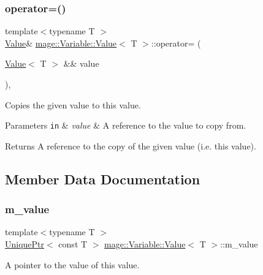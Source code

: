 \subsubsection{\texorpdfstring{operator=()}{operator=()}\hspace{0.1cm}{\footnotesize\ttfamily [2/2]}}
{\footnotesize\ttfamily template$<$typename T $>$ \\
\hyperlink{structmage_1_1_variable_1_1_value}{Value}\& \hyperlink{structmage_1_1_variable_1_1_value}{mage\+::\+Variable\+::\+Value}$<$ T $>$\+::operator= (\begin{DoxyParamCaption}\item[{\hyperlink{structmage_1_1_variable_1_1_value}{Value}$<$ T $>$ \&\&}]{value }\end{DoxyParamCaption})\hspace{0.3cm}{\ttfamily [private]}, {\ttfamily [delete]}}

Copies the given value to this value.


\begin{DoxyParams}[1]{Parameters}
\mbox{\tt in}  & {\em value} & A reference to the value to copy from. \\
\hline
\end{DoxyParams}
\begin{DoxyReturn}{Returns}
A reference to the copy of the given value (i.\+e. this value). 
\end{DoxyReturn}


\subsection{Member Data Documentation}
\hypertarget{structmage_1_1_variable_1_1_value_ae034b2263375fdcfdba4f0cfdb3cd014}{}\label{structmage_1_1_variable_1_1_value_ae034b2263375fdcfdba4f0cfdb3cd014} 
\subsubsection{\texorpdfstring{m\+\_\+value}{m\_value}}
{\footnotesize\ttfamily template$<$typename T $>$ \\
\hyperlink{namespacemage_a8c307fbcc33bce9b7f2aa4c26c3b95cf}{Unique\+Ptr}$<$ const T $>$ \hyperlink{structmage_1_1_variable_1_1_value}{mage\+::\+Variable\+::\+Value}$<$ T $>$\+::m\+\_\+value\hspace{0.3cm}{\ttfamily [private]}}

A pointer to the value of this value. 